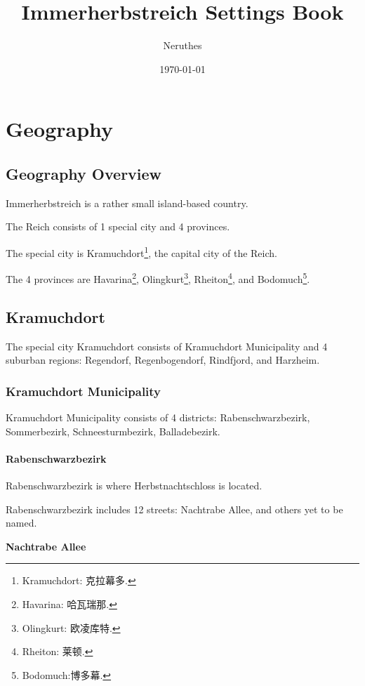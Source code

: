 \documentclass[a4paper,11pt]{report}
\title{Immerherbstreich Settings Book}
\author{Neruthes}
\date{\today}
\begin{document}
\begin{titlepage}
	\maketitle
\end{titlepage}
\tableofcontents
\clearpage

\chapter{Geography}
\section{Geography Overview}

Immerherbstreich is a rather small island-based country.

The Reich consists of 1 special city and 4 provinces.

The special city is Kramuchdort\footnote{Kramuchdort: 克拉幕多.}, the capital city of the Reich.

The 4 provinces are
Havarina\footnote{Havarina: 哈瓦瑞那.},
Olingkurt\footnote{Olingkurt: 欧凌库特.},
Rheiton\footnote{Rheiton: 莱顿.},
and Bodomuch\footnote{Bodomuch:博多幕.}.

\section{Kramuchdort}

The special city Kramuchdort consists of Kramuchdort Municipality and 4 suburban regions:
Regendorf, Regenbogendorf, Rindfjord, and Harzheim.

\subsection{Kramuchdort Municipality}

Kramuchdort Municipality consists of 4 districts:
Rabenschwarzbezirk, Sommerbezirk, Schneesturmbezirk, Balladebezirk.

\subsubsection{Rabenschwarzbezirk}

Rabenschwarzbezirk is where Herbstnachtschloss is located.

Rabenschwarzbezirk includes 12 streets:
Nachtrabe Allee,
and others yet to be named.

{\sffamily\bfseries Nachtrabe Allee}
\end{document}
